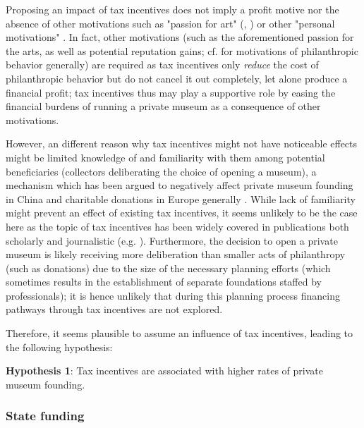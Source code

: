 \documentclass[11pt, authoryear]{elsarticle}
\begin{document}
Proposing an impact of tax incentives does not imply a profit motive nor the absence of other motivations such as "passion for art" (\citealt[p.7]{Zorloni_Resch_2016_opportunities}, \citealt[p.12]{Adam_2021_rise}) or other "personal motivations" \citep[p.144]{Walker_2019_collector}. 
In fact, other motivations (such as the aforementioned passion for the arts, as well as potential reputation gains; cf. \citet{Bekkers_Wiepking_2010_literature} for motivations of philanthropic behavior generally) are required as tax incentives only \emph{reduce} the cost of philanthropic behavior but do not cancel it out completely, let alone produce a financial profit; tax incentives thus may play a supportive role by easing the financial burdens of running a private museum as a consequence of other motivations.


However, an different reason why tax incentives might not have noticeable effects might be limited knowledge of and familiarity with them among potential beneficiaries (collectors deliberating the choice of opening a museum), a mechanism which has been argued to negatively affect private museum founding in China \citep[p.222]{DeNigris_2018_museums} and charitable donations in Europe generally \citep{Hemels_2017_incentives}.
While lack of familiarity might prevent an effect of existing tax incentives, it seems unlikely to be the case here as the topic of tax incentives has been widely covered in publications both scholarly \citep{Walker_2019_collector,Zorloni_Resch_2016_opportunities} and journalistic (e.g. \citealt{Brown_Pes_2018_taxpayers,Boucher_2020_solow}).
Furthermore, the decision to open a private museum is likely receiving more deliberation than smaller acts of philanthropy (such as donations) due to the size of the necessary planning efforts (which sometimes results in the establishment of separate foundations staffed by professionals); it is hence unlikely that during this planning process financing pathways through tax incentives are not explored.


Therefore, it seems plausible to assume an influence of tax incentives, leading to the following hypothesis:

\bigbreak
\noindent
\textbf{Hypothesis 1}: Tax incentives are associated with higher rates of private museum founding.




\subsubsection*{State funding}
\end{document}
